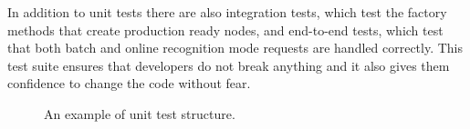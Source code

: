 In addition to unit tests there are also integration tests,
  which test the factory methods that create production ready nodes,
  and end-to-end tests,
  which test that both batch and online recognition mode requests are handled correctly.
This test suite ensures that developers do not break anything
  and it also gives them confidence to change the code without fear.

\begin{figure}[h]
  

  \caption{An example of unit test structure.}
  \label{fig:unit-test}
\end{figure}


